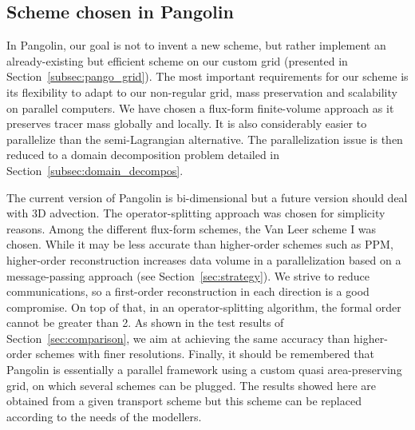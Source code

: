 \subsection{Scheme chosen in Pangolin}
In Pangolin, our goal is not to invent a new scheme, but rather implement an
already-existing but efficient scheme on our custom grid (presented in
Section~\ref{subsec:pango_grid}). The most important requirements for our
scheme is its flexibility to adapt to our non-regular grid, mass preservation
and scalability on parallel computers. We have chosen a flux-form finite-volume
approach as it preserves tracer mass globally and locally. It is also
considerably easier to parallelize than the semi-Lagrangian alternative.  The
parallelization issue is then reduced to a domain decomposition problem detailed
in Section~\ref{subsec:domain_decompos}.

The current version of Pangolin is bi-dimensional but a future version should
deal with 3D advection. The operator-splitting approach was chosen for
simplicity reasons. Among the different flux-form schemes, the Van Leer scheme I
was chosen. While it may be less accurate than higher-order schemes such as
\gls{PPM}, higher-order reconstruction increases data volume in a
parallelization based on a message-passing approach (see
Section~\ref{sec:strategy}). We strive to reduce communications, so a first-order
reconstruction in each direction is a good compromise. On top of that, in an
operator-splitting algorithm, the formal order cannot be greater than 2.  As
shown in the test results of Section~\ref{sec:comparison}, we aim at
achieving the same accuracy than higher-order schemes with finer resolutions.
Finally, it should be remembered that Pangolin is essentially a parallel framework
using a custom quasi area-preserving grid, on which several schemes can be
plugged. The results showed here are obtained from a given transport scheme but
this scheme can be replaced according to the needs of the modellers.

